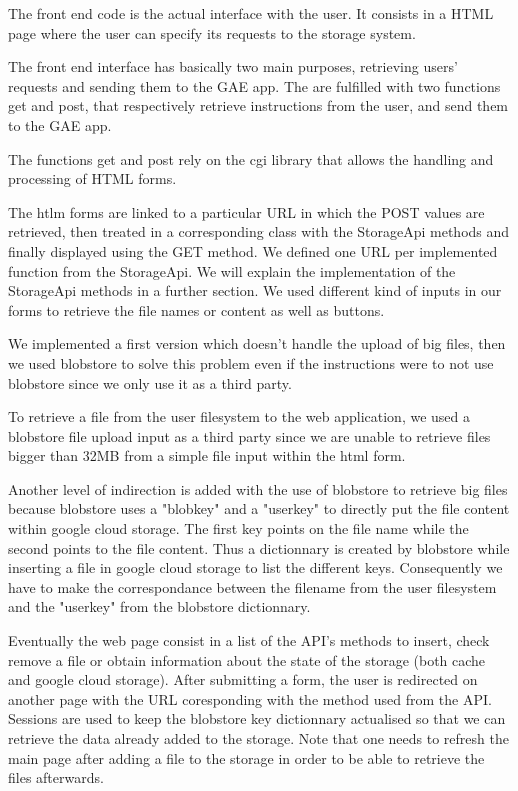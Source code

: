 \documentclass{article}
\begin{document}
The front end code is the actual interface with the user. It consists in a HTML page where the user can specify its requests to the storage system. 

The front end  interface has basically two main purposes, retrieving users' requests and sending them to the GAE app. The are fulfilled with two functions get and post, that respectively retrieve instructions from the user, and send them to the GAE app.

The functions get and post rely on the cgi library that allows the handling and processing of HTML forms.





The htlm forms are linked to a particular URL in which the POST values are retrieved, then treated in a corresponding class with the StorageApi methods and finally displayed using the GET method. We defined one URL per implemented function from the StorageApi. We will explain the implementation of the StorageApi methods in a further section. We used different kind of inputs in our forms to retrieve the file names or content as well as buttons.



We implemented a first version which doesn't handle the upload of big files, then we used blobstore to solve this problem even if the instructions were to not use blobstore since we only use it as a third party.

To retrieve a file from the user filesystem to the web application, we used a blobstore file upload input as a third party since we are unable to retrieve files bigger than 32MB from a simple file input within the html form. 





Another level of indirection is added with the use of blobstore to retrieve big files because blobstore uses a "blobkey" and a "userkey" to directly put the file content within google cloud storage. The first key points on the file name while the second points to the file content. Thus a dictionnary is created by blobstore while inserting a file in google cloud storage to list the different keys. Consequently we have to make the correspondance between the filename from the user filesystem and the "userkey" from the blobstore dictionnary.



Eventually the web page consist in a list of the API's methods to insert, check remove a file or obtain information about the state of the storage (both cache and google cloud storage). After submitting a form, the user is redirected on another page with the URL coresponding with the method used from the API. Sessions are used to keep the blobstore key dictionnary actualised so that we can retrieve the data already added to the storage. Note that one needs to refresh the main page after adding a file to the storage in order to be able to retrieve the files afterwards.
\end{document}
